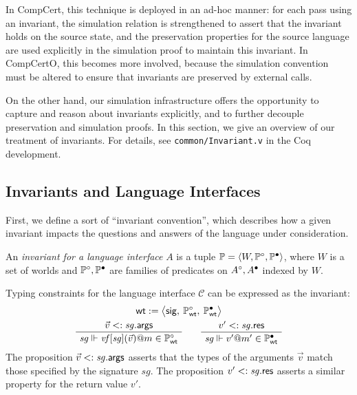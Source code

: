 \documentclass[sigplan,screen]{acmart}
\newenvironment{optional}{}{}
\begin{document}
\begin{optional}
In CompCert,
this technique is deployed in an ad-hoc manner:
for each pass using an invariant,
the simulation relation is strengthened to assert that
the invariant holds on the source state,
and the preservation properties for the source language
are used explicitly in the simulation proof
to maintain this invariant.
In CompCertO,
this becomes more involved,
because the simulation convention must be altered
to ensure that invariants are preserved
by external calls.

On the other hand,
our simulation infrastructure offers the opportunity
to capture and reason about invariants explicitly,
and to further decouple preservation and simulation proofs.
In this section,
we give an overview of our treatment of invariants.
For details,
see
\texttt{common/Invariant.v}
in the Coq development.


\subsection{Invariants and Language Interfaces} %

First, we define a sort of ``invariant convention'',
which describes how a given invariant impacts the questions and answers
of the language under consideration.

\begin{definition} %
An \emph{invariant for a language interface} $A$
is a tuple
$\mathbb{P} = \langle W, \mathbb{P}^\circ, \mathbb{P}^\bullet \rangle$,
where $W$ is a set of worlds
and $\mathbb{P}^\circ, \mathbb{P}^\bullet$
are families of predicates on $A^\circ, A^\bullet$
indexed by $W$.
\end{definition}

\begin{example} \label{ex:wt} %
Typing constraints for the language interface $\mathcal{C}$
can be expressed as the invariant:
\begin{gather*}
  \kw{wt} :=
    \big\langle
      \kw{sig}, \:
      \mathbb{P}_\kw{wt}^\que, \:
      \mathbb{P}_\kw{wt}^\ans
    \big\rangle
  \\
  \AxiomC{$\vec{v} <: \mathit{sg}.\kw{args}$}
  \UnaryInfC{$\mathit{sg} \Vdash
    \mathit{vf}[\mathit{sg}](\vec{v})@m \in \mathbb{P}_\kw{wt}^\que$}
  \DisplayProof
  \qquad
  \AxiomC{$v' <: \mathit{sg}.\kw{res}$}
  \UnaryInfC{$\mathit{sg} \Vdash
    v'@m' \in \mathbb{P}_\kw{wt}^\ans$}
  \DisplayProof
\end{gather*}
The proposition $\vec{v} <: \mathit{sg}. \mathsf{args} $
asserts that the types of the arguments $\vec{v}$
match those specified by the signature $\mathit{sg}$.
The proposition $v' <: \mathit{sg}. \mathsf{res} $
asserts a similar property for the return value $v'$.
\end{example}


\end{optional}
\end{document}
